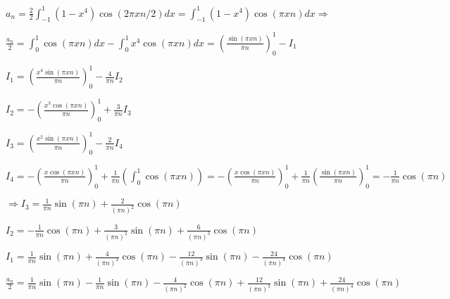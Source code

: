 \documentclass[paper=a4, fontsize=11pt]{scrartcl} %
\numberwithin{equation}{section} %
\numberwithin{figure}{section} %
\numberwithin{table}{section} %
\begin{document}
\begin{center}
$a_{n} = \frac{2}{2}\int_{-1}^{1}(1-x^{4})\cos(2\pi x n /2)dx = \int_{-1}^{1}(1-x^{4})\cos(\pi x n)dx \Rightarrow $
\end{center}

\begin{center}
$\frac{a_{n}}{2} = \int_{0}^{1}\cos(\pi x n)dx - \int_{0}^{1}x^{4}\cos(\pi x n)dx = \left( \frac{\sin(\pi x n)}{\pi n} \right)_{0}^{1} - I_{1}$
\end{center}

\begin{center}
$I_{1} = \left( \frac{x^{4}\sin(\pi x n)}{\pi n} \right)_{0}^{1} - \frac{4}{\pi n}I_{2}$
\end{center}

\begin{center}
$I_{2} = -\left( \frac{x^{3}\cos(\pi x n)}{\pi n} \right)_{0}^{1} + \frac{3}{\pi n}I_{3}$
\end{center}

\begin{center}
$I_{3} = \left( \frac{x^{2}\sin(\pi x n)}{\pi n} \right)_{0}^{1} - \frac{2}{\pi n}I_{4}$
\end{center}

\begin{center}
$I_{4} = -\left( \frac{x\cos(\pi x n)}{\pi n} \right)_{0}^{1} + \frac{1}{\pi n}\left( \int_{0}^{1}\cos(\pi x n) \right) = -\left( \frac{x\cos(\pi x n)}{\pi n} \right)_{0}^{1} + \frac{1}{\pi n}\left( \frac{\sin(\pi x n)}{\pi n} \right)_{0}^{1} = -\frac{1}{\pi n}\cos(\pi n)$
\end{center}

\begin{center}
$\Rightarrow I_{3} = \frac{1}{\pi n}\sin(\pi n) + \frac{2}{(\pi n)^{2}}\cos(\pi n)$
\end{center}

\begin{center}
$I_{2} = -\frac{1}{\pi n}\cos(\pi n)+\frac{3}{(\pi n)^{2}}\sin(\pi n) + \frac{6}{(\pi n)^{3}}\cos(\pi n)$
\end{center}

\begin{center}
$I_{1} = \frac{1}{\pi n}\sin(\pi n)+\frac{4}{(\pi n)^{2}}\cos(\pi n)-\frac{12}{(\pi n)^{3}}\sin(\pi n) - \frac{24}{(\pi n)^{4}}\cos(\pi n)$
\end{center}

\begin{center}
$\frac{a_{n}}{2} = \frac{1}{\pi n}\sin(\pi n)-\frac{1}{\pi n}\sin(\pi n)-\frac{4}{(\pi n)^{2}}\cos(\pi n)+\frac{12}{(\pi n)^{3}}\sin(\pi n) + \frac{24}{(\pi n)^{4}}\cos(\pi n)$
\end{center}
\end{document}
